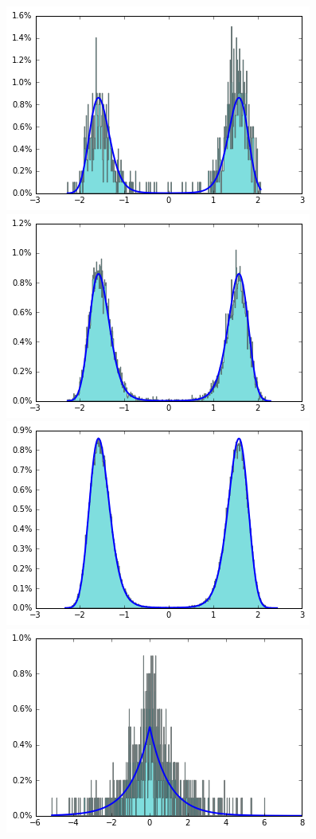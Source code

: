 \documentclass[final]{beamer}
\newlength{\onecolwid}
\begin{document}
\begin{frame}[t]
\begin{columns}[t]
\begin{column}{\onecolwid}
\begin{figure}
    \includegraphics[width=.33\onecolwid]{../figure/case2_step_0.005_iter_1e3.png}
    \includegraphics[width=.33\onecolwid]{../figure/case2_step_0.005_iter_1e4.png}
    \includegraphics[width=.33\onecolwid]{../figure/case2_step_0.005_iter_1e5.png}\\
    \includegraphics[width=.33\onecolwid]{../figure/case3_step_0.005_iter_1e3.png}

\end{figure}
\end{column}
\end{columns}
\end{frame}
\end{document}
